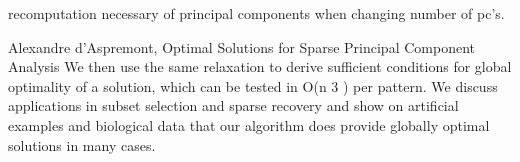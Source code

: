 recomputation necessary of principal components when changing number of pc's.

Alexandre d’Aspremont, Optimal Solutions for Sparse Principal Component Analysis
We then use the same relaxation to derive sufficient conditions for global optimality of a
solution, which can be tested in O(n
3
) per pattern. We discuss applications in subset selection and
sparse recovery and show on artificial examples and biological data that our algorithm does provide
globally optimal solutions in many cases.
